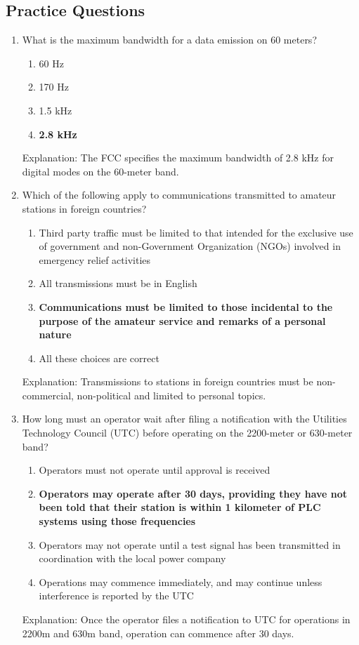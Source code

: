 \subsection*{Practice Questions}
\begin{enumerate}
    \item What is the maximum bandwidth for a data emission on 60 meters?
        \begin{enumerate}
       \item 60 Hz
        \item  170 Hz
      \item  1.5 kHz
        \item \textbf {2.8 kHz}
    \end{enumerate}
     \textcolor{myred}{Explanation:}
     The FCC specifies the maximum bandwidth of 2.8 kHz for digital modes on the 60-meter band.
        
        \item Which of the following apply to communications transmitted to amateur stations in foreign countries?
    \begin{enumerate}
        \item Third party traffic must be limited to that intended for the exclusive use of government and non-Government Organization (NGOs) involved in emergency relief activities
        \item  All transmissions must be in English
        \item \textbf {Communications must be limited to those incidental to the purpose of the amateur service and remarks of a personal nature}
        \item  All these choices are correct
    \end{enumerate}
     \textcolor{myred}{Explanation:}
    Transmissions to stations in foreign countries must be non-commercial, non-political and limited to personal topics.
        
        \item How long must an operator wait after filing a notification with the Utilities Technology Council (UTC) before operating on the 2200-meter or 630-meter band?
        \begin{enumerate}
          \item Operators must not operate until approval is received
       \item \textbf {Operators may operate after 30 days, providing they have not been told that their station is within 1 kilometer of PLC systems using those frequencies}
      \item  Operators may not operate until a test signal has been transmitted in coordination with the local power company
    \item  Operations may commence immediately, and may continue unless interference is reported by the UTC
       \end{enumerate}
       \textcolor{myred}{Explanation:}
      Once the operator files a notification to UTC for operations in 2200m and 630m band, operation can commence after 30 days.
        

\end{enumerate}
